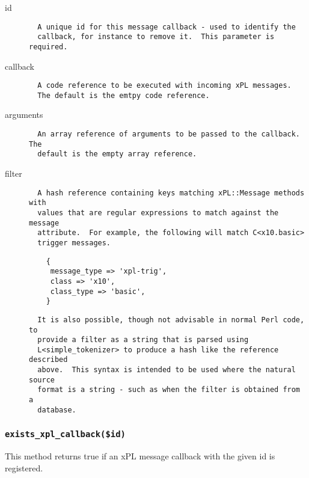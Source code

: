 \begin{description}

\item[{id}] \mbox{}\begin{verbatim}
  A unique id for this message callback - used to identify the
  callback, for instance to remove it.  This parameter is required.
\end{verbatim}

\item[{callback}] \mbox{}\begin{verbatim}
  A code reference to be executed with incoming xPL messages.
  The default is the emtpy code reference.
\end{verbatim}

\item[{arguments}] \mbox{}\begin{verbatim}
  An array reference of arguments to be passed to the callback.  The
  default is the empty array reference.
\end{verbatim}

\item[{filter}] \mbox{}\begin{verbatim}
  A hash reference containing keys matching xPL::Message methods with
  values that are regular expressions to match against the message
  attribute.  For example, the following will match C<x10.basic>
  trigger messages.
\end{verbatim}
\begin{verbatim}
    {
     message_type => 'xpl-trig',
     class => 'x10',
     class_type => 'basic',
    }
\end{verbatim}
\begin{verbatim}
  It is also possible, though not advisable in normal Perl code, to
  provide a filter as a string that is parsed using
  L<simple_tokenizer> to produce a hash like the reference described
  above.  This syntax is intended to be used where the natural source
  format is a string - such as when the filter is obtained from a
  database.
\end{verbatim}
\end{description}
\subsubsection*{\texttt{exists\_xpl\_callback(\$id)}\label{xPL::Listener_exists_xpl_callback_id_}}


This method returns true if an xPL message callback with the given id
is registered.


